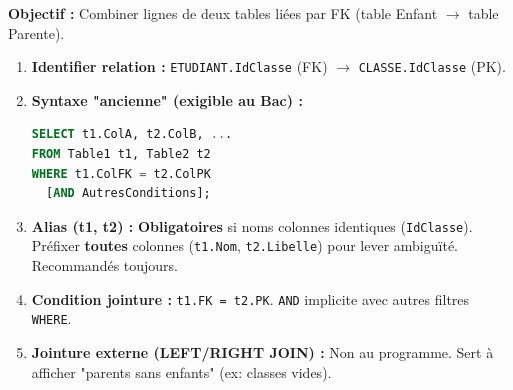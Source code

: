 \documentclass[11pt]{article}
\begin{document}
\begin{methode}
\textbf{Objectif :} Combiner lignes de deux tables liées par FK (table Enfant $\rightarrow$ table Parente).
\begin{enumerate}
    \item \textbf{Identifier relation :} \texttt{ETUDIANT.IdClasse} (FK) $\rightarrow$ \texttt{CLASSE.IdClasse} (PK).
    \item \textbf{Syntaxe "ancienne" (exigible au Bac) :}
\begin{lstlisting}[language=SQL]
SELECT t1.ColA, t2.ColB, ...
FROM Table1 t1, Table2 t2
WHERE t1.ColFK = t2.ColPK
  [AND AutresConditions];
\end{lstlisting}
    \item \textbf{Alias (t1, t2) :} \textbf{Obligatoires} si noms colonnes identiques (\texttt{IdClasse}). Préfixer \textbf{toutes} colonnes (\texttt{t1.Nom}, \texttt{t2.Libelle}) pour lever ambiguïté. Recommandés toujours.
    \item \textbf{Condition jointure :} \texttt{t1.FK = t2.PK}. \texttt{AND} implicite avec autres filtres \texttt{WHERE}.
    \item \textbf{Jointure externe (LEFT/RIGHT JOIN) :} Non au programme. Sert à afficher "parents sans enfants" (ex: classes vides).
\end{enumerate}
\end{methode}
\end{document}
